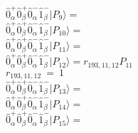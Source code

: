 \documentclass[14pt]{article}
\begin{document}
    $ \hat{0}_{\alpha}^{+}\hat{0}_{\beta}^{+}\hat{0}_{\alpha}^{-}\hat{1}_{\beta}^{-} \vert{P_{9}}\rangle =  $ \\ 
    $ \hat{0}_{\alpha}^{+}\hat{0}_{\beta}^{+}\hat{0}_{\alpha}^{-}\hat{1}_{\beta}^{-} \vert{P_{10}}\rangle =  $ \\ 
    $ \hat{0}_{\alpha}^{+}\hat{0}_{\beta}^{+}\hat{0}_{\alpha}^{-}\hat{1}_{\beta}^{-} \vert{P_{11}}\rangle =  $ \\ 
    $ \hat{0}_{\alpha}^{+}\hat{0}_{\beta}^{+}\hat{0}_{\alpha}^{-}\hat{1}_{\beta}^{-} \vert{P_{12}}\rangle = {r}_{193,11,12}P_{11} $ \\ 
    ${r}_{193,11,12}\ =\ 1 $ \\ 
    $ \hat{0}_{\alpha}^{+}\hat{0}_{\beta}^{+}\hat{0}_{\alpha}^{-}\hat{1}_{\beta}^{-} \vert{P_{13}}\rangle =  $ \\ 
    $ \hat{0}_{\alpha}^{+}\hat{0}_{\beta}^{+}\hat{0}_{\alpha}^{-}\hat{1}_{\beta}^{-} \vert{P_{14}}\rangle =  $ \\ 
    $ \hat{0}_{\alpha}^{+}\hat{0}_{\beta}^{+}\hat{0}_{\alpha}^{-}\hat{1}_{\beta}^{-} \vert{P_{15}}\rangle =  $ \\ 
    
\end{document}
